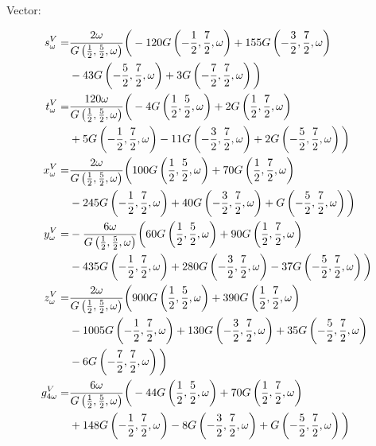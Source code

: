 \documentclass[aps,prc,superscriptaddress,showpacs,floatfix, nofootinbib,preprintnumbers,twocolumn]{revtex4}
\begin{document}
Vector:
\begin{scriptsize}
\begin{align}
s^V_{\omega }=&\frac{2 \omega  }{G\left(\frac{1}{2},\frac{5}{2},\omega \right)}\bigg{(}-120 G\left(-\frac{1}{2},\frac{7}{2},\omega \right)+155 G\left(-\frac{3}{2},\frac{7}{2},\omega \right)\nonumber\\
&-43 G\left(-\frac{5}{2},\frac{7}{2},\omega \right)+3 G\left(-\frac{7}{2},\frac{7}{2},\omega \right)\bigg{)}\\
t^V_{\omega }=&\frac{120 \omega  }{G\left(\frac{1}{2},\frac{5}{2},\omega \right)}\bigg{(}-4 G\left(\frac{1}{2},\frac{5}{2},\omega \right)+2 G\left(\frac{1}{2},\frac{7}{2},\omega \right)\nonumber\\
&+5 G\left(-\frac{1}{2},\frac{7}{2},\omega \right)-11 G\left(-\frac{3}{2},\frac{7}{2},\omega \right)+2 G\left(-\frac{5}{2},\frac{7}{2},\omega \right)\bigg{)}\\
x^V_{\omega }=&\frac{2 \omega  }{G\left(\frac{1}{2},\frac{5}{2},\omega \right)}\bigg{(}100 G\left(\frac{1}{2},\frac{5}{2},\omega \right)+70 G\left(\frac{1}{2},\frac{7}{2},\omega \right)\nonumber\\
&-245 G\left(-\frac{1}{2},\frac{7}{2},\omega \right)+40 G\left(-\frac{3}{2},\frac{7}{2},\omega \right)+G\left(-\frac{5}{2},\frac{7}{2},\omega \right)\bigg{)}\\
y^V_{\omega }=&-\frac{6 \omega  }{G\left(\frac{1}{2},\frac{5}{2},\omega \right)}\bigg{(}60 G\left(\frac{1}{2},\frac{5}{2},\omega \right)+90 G\left(\frac{1}{2},\frac{7}{2},\omega \right)\nonumber\\
&-435 G\left(-\frac{1}{2},\frac{7}{2},\omega \right)+280 G\left(-\frac{3}{2},\frac{7}{2},\omega \right)-37 G\left(-\frac{5}{2},\frac{7}{2},\omega \right)\bigg{)}\\
z^V_{\omega }=&\frac{2 \omega  }{G\left(\frac{1}{2},\frac{5}{2},\omega \right)}\bigg{(}900 G\left(\frac{1}{2},\frac{5}{2},\omega \right)+390 G\left(\frac{1}{2},\frac{7}{2},\omega \right)\nonumber\\
&-1005 G\left(-\frac{1}{2},\frac{7}{2},\omega \right)+130 G\left(-\frac{3}{2},\frac{7}{2},\omega \right)+35 G\left(-\frac{5}{2},\frac{7}{2},\omega \right)\nonumber\\
&-6 G\left(-\frac{7}{2},\frac{7}{2},\omega \right)\bigg{)}\\
g^V_{4\omega }=&\frac{6 \omega  }{G\left(\frac{1}{2},\frac{5}{2},\omega \right)}\bigg{(}-44 G\left(\frac{1}{2},\frac{5}{2},\omega \right)+70 G\left(\frac{1}{2},\frac{7}{2},\omega \right)\nonumber\\
&+148 G\left(-\frac{1}{2},\frac{7}{2},\omega \right)-8 G\left(-\frac{3}{2},\frac{7}{2},\omega \right)+G\left(-\frac{5}{2},\frac{7}{2},\omega \right)\bigg{)}
\end{align}
\end{scriptsize}
\end{document}
